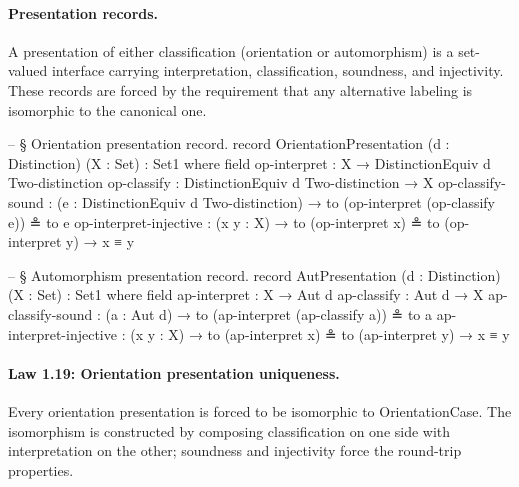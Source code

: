 \documentclass[11pt,a4paper]{book}
\def\texttt#1{#1}%
\begin{document}
\paragraph{Presentation records.}
A presentation of either classification (orientation or automorphism) is a set-valued interface carrying interpretation, classification, soundness, and injectivity.
These records are forced by the requirement that any alternative labeling is isomorphic to the canonical one.

\begin{code}
-- § Orientation presentation record.
record OrientationPresentation (d : Distinction) (X : Set) : Set1 where
  field
    op-interpret           : X → DistinctionEquiv d Two-distinction
    op-classify            : DistinctionEquiv d Two-distinction → X
    op-classify-sound      : (e : DistinctionEquiv d Two-distinction) → to (op-interpret (op-classify e)) ≗ to e
    op-interpret-injective : (x y : X) → to (op-interpret x) ≗ to (op-interpret y) → x ≡ y

-- § Automorphism presentation record.
record AutPresentation (d : Distinction) (X : Set) : Set1 where
  field
    ap-interpret           : X → Aut d
    ap-classify            : Aut d → X
    ap-classify-sound      : (a : Aut d) → to (ap-interpret (ap-classify a)) ≗ to a
    ap-interpret-injective : (x y : X) → to (ap-interpret x) ≗ to (ap-interpret y) → x ≡ y
\end{code}

\paragraph{Law 1.19: Orientation presentation uniqueness.}
Every orientation presentation is forced to be isomorphic to \texttt{OrientationCase}.
The isomorphism is constructed by composing classification on one side with interpretation on the other; 
soundness and injectivity force the round-trip properties.
\end{document}
